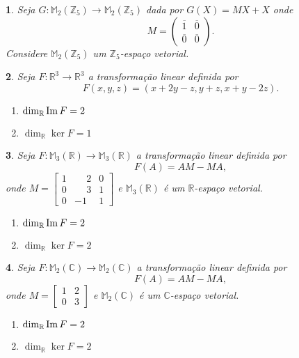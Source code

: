 \documentclass[12pt]{exam}
\newtheorem{exercicio}{}
\newcommand{\im}{{\rm Im\,}}
\newcommand{\z}{\mathbb{Z}}
\newcommand{\real}{\mathbb{R}}
\newcommand{\complex}{\mathbb{C}}
\newcommand{\cp}[1]{\mathbb{#1}}
\begin{document}
\begin{exercicio}
  Seja $G : \cp{M}_2(\z_5) \to \cp{M}_2(\z_5)$ dada por $G(X) = MX + X$ onde
    \[
      M = \begin{pmatrix}
        \overline{1} & \overline{0}\\
        \overline{0} & \overline{0}
      \end{pmatrix}.
    \]
    Considere $\cp{M}_2(\z_5)$ um $\z_5$-espa\c{c}o vetorial.
\end{exercicio}


\begin{exercicio}
  Seja $F : \real^3 \to \real^3$ a transforma\c{c}\~ao linear definida por
  \[
    F(x,y,z) = (x + 2y - z, y + z, x + y - 2z).
  \]
  \begin{solucao}
    \begin{enumerate}[label=({\alph*})]
      \item $\dim_\real\im F = 2$
      \item $\dim_\real\ker F = 1$
    \end{enumerate}
  \end{solucao}
\end{exercicio}

\begin{exercicio}
  Seja $F : \cp{M}_3(\real) \to \cp{M}_3(\real)$ a transforma\c{c}\~ao linear definida por
  \[
    F(A) = AM - MA,
  \]
  onde $M = \begin{bmatrix}
    1 & \phantom{-}2 & 0\\0 & \phantom{-}3 & 1\\0 & -1 & 1
  \end{bmatrix}$ e $\cp{M}_3(\real)$ \'e um $\real$-espa\c{c}o vetorial.
  \begin{solucao}
    \begin{enumerate}[label=({\alph*})]
      \item $\dim_\real\im F = 2$
      \item $\dim_\real\ker F = 2$
    \end{enumerate}
  \end{solucao}
\end{exercicio}

\begin{exercicio}\label{nucleo_imagem_fim}
  Seja $F : \cp{M}_2(\complex) \to \cp{M}_2(\complex)$ a transforma\c{c}\~ao linear definida por
  \[
    F(A) = AM - MA,
  \]
  onde $M = \begin{bmatrix}
    1 & 2\\0 & 3
  \end{bmatrix}$ e $\cp{M}_2(\complex)$ \'e um $\complex$-espa\c{c}o vetorial.
  \begin{solucao}
    \begin{enumerate}[label=({\alph*})]
      \item $\dim_\real\im F = 2$
      \item $\dim_\real\ker F = 2$
    \end{enumerate}
  \end{solucao}
\end{exercicio}
\end{document}
